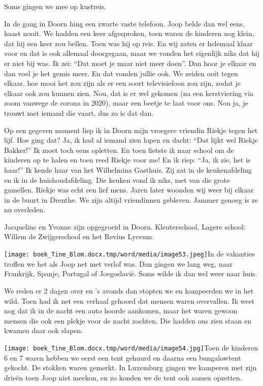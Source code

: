 \documentclass{scrbook}
\begin{document}
{Soms gingen we mee op kustreis. 

In de gang in Doorn hing een zwarte vaste telefoon. Joop belde dan wel eens, haast nooit. We hadden een keer afgesproken, toen waren de kinderen nog klein, dat hij een keer zou bellen. Toen was hij op reis. En wij zaten er helemaal klaar voor en dat is ook allemaal doorgegaan, maar we vonden het eigenlijk niks dat hij er niet bij was. Ik zei: ``Dat moet je maar niet meer doen''. Dan hoor je elkaar en dan voel je het gemis meer. En dat vonden jullie ook. We zeiden ooit tegen elkaar, hoe mooi het zou zijn als er een soort televisiefoon zou zijn, zodat je elkaar ook zou kunnen zien. Nou, dat is er wel gekomen (na een kerstviering via zoom vanwege de corona in 2020), maar een beetje te laat voor ons. Nou ja, je trouwt met iemand die vaart, dus zo is dat dan.

Op een gegeven moment liep ik in Doorn mijn vroegere vriendin Riekje tegen het lijf. Hoe ging dat? Ja, ik had al iemand zien lopen en dacht: ``Dat lijkt wel Riekje Bakker!'' Ik moet toch eens opletten. En toen fietste ik naar school om de kinderen op te halen en toen reed Riekje voor me! En ik riep: ``Ja, ik zie, het is haar!'' Ik kende haar van het Wilhelmina Gasthuis. Zij zat in de keukenafdeling en ik in de huishoudafdeling. Die keuken vond ik niks, met van die grote gamellen. Riekje was echt een lief mens. Jaren later woonden wij weer bij elkaar in de buurt in Drenthe. We zijn altijd vriendinnen gebleven. Jammer genoeg is ze nu overleden.

Jacqueline en Yvonne zijn opgegroeid in Doorn. Kleuterschool, Lagere school: Willem de Zwijgerschool en het Revius Lyceum. 

\texttt{[image: boek\_Tine\_Blom.docx.tmp/word/media/image53.jpeg]}In de vakanties troffen we het als Joop net met verlof was. Dan gingen we lang weg, naar Frankrijk, Spanje, Portugal of Joegoslavi\"{e}. Soms wilde ik dan wel weer naar huis.

We reden er 2 dagen over en ’s avonds dan stopten we en kampeerden we in het wild. Toen had ik net een verhaal gehoord dat mensen waren overvallen. Ik weet nog dat ik in de nacht een auto hoorde aankomen, maar het waren gewoon mensen die ook een plekje voor de nacht zochten. Die hadden ons zien staan en kwamen daar ook slapen.

\texttt{[image: boek\_Tine\_Blom.docx.tmp/word/media/image54.jpg]}Toen de kinderen 6 en 7 waren hebben we eerst een tent gehuurd en daarna een bungalowtent gekocht. De stokken waren gemerkt. In Luxemburg gingen we kamperen met zijn drie\"{e}n toen Joop niet meekon, en zo konden we de tent ook samen opzetten.

}
\end{document}
